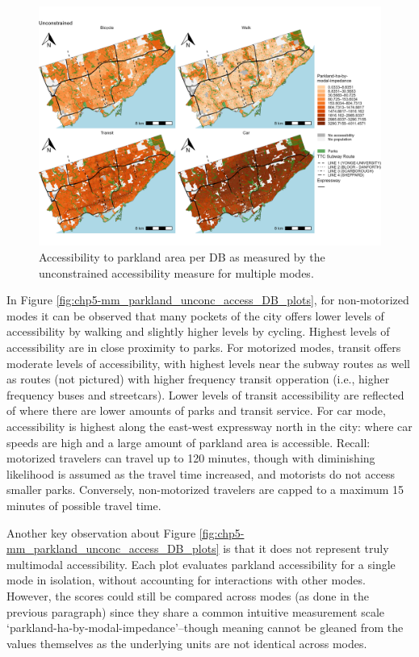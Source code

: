 \documentclass[
11pt, %
oneside, %
english, %
singlespacing, %
]{macthesis} %
\begin{document}
\begin{figure}

{\centering \includegraphics[width=6in]{./data/figures/chp5-mm_parkland_unconc_access_DB_plots} 

}

\caption{\label{fig:chp5-mm_parkland_unconc_access_DB_plots}Accessibility to parkland area per DB as measured by the unconstrained accessibility measure for multiple modes.}\label{fig:unnamed-chunk-74}
\end{figure}

In Figure \ref{fig:chp5-mm_parkland_unconc_access_DB_plots}, for non-motorized modes it can be observed that many pockets of the city offers lower levels of accessibility by walking and slightly higher levels by cycling. Highest levels of accessibility are in close proximity to parks. For motorized modes, transit offers moderate levels of accessibility, with highest levels near the subway routes as well as routes (not pictured) with higher frequency transit opperation (i.e., higher frequency buses and streetcars). Lower levels of transit accessibility are reflected of where there are lower amounts of parks and transit service. For car mode, accessibility is highest along the east-west expressway north in the city: where car speeds are high and a large amount of parkland area is accessible. Recall: motorized travelers can travel up to 120 minutes, though with diminishing likelihood is assumed as the travel time increased, and motorists do not access smaller parks. Conversely, non-motorized travelers are capped to a maximum 15 minutes of possible travel time.

Another key observation about Figure \ref{fig:chp5-mm_parkland_unconc_access_DB_plots} is that it does not represent truly multimodal accessibility. Each plot evaluates parkland accessibility for a single mode in isolation, without accounting for interactions with other modes. However, the scores could still be compared across modes (as done in the previous paragraph) since they share a common intuitive measurement scale `parkland-ha-by-modal-impedance'--though meaning cannot be gleaned from the values themselves as the underlying units are not identical across modes.
\end{document}
